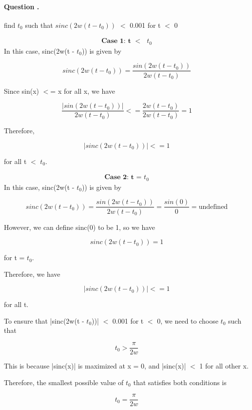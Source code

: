\documentclass[14pt,a4paper]{report}
\newcounter{question}
\newcommand*\question{%
\stepcounter{question}%
\paragraph{Question \thesection.\thequestion}}
\begin{document}
\question
{
    find $t_0$ such that $sinc(2w(t - t_0 ))$ $<$ 0.001 for t $<$ 0
}
\begin{answer_box*}

\begin{align}
    \textbf{Case 1: t $<$ $t_0$}
\end{align}
    In this case, sinc(2w(t - $t_0$)) is given by

    $$sinc(2w(t - t_0)) = \frac{sin(2w(t - t_0))}{2w(t - t_0)}$$

    Since sin(x) $<$= x for all x, we have

    $$\frac{|sin(2w(t - t_0))|}{2w(t - t_0)} <= \frac{2w(t - t_0)}{2w(t - t_0)} = 1$$

    Therefore,

    $$|sinc(2w(t - t_0))| <= 1$$

    for all t $<$ $t_0$.

\begin{align}
    \textbf{Case 2: t = $t_0$}
\end{align}
    In this case, sinc(2w(t - $t_0$)) is given by

    $$sinc(2w(t - t_0)) = \frac{sin(2w(t - t_0))}{2w(t - t_0)} = \frac{sin(0)}{0} = \text{undefined}$$

    However, we can define sinc(0) to be 1, so we have

    $$sinc(2w(t - t_0)) = 1$$

    for t = $t_0$.

    Therefore, we have

    $$|sinc(2w(t - t_0))| <= 1$$

    for all t.
    
    To ensure that |sinc(2w(t - $t_0$))| $<$ 0.001 for t $<$ 0, we need to choose $t_0$ such that

    $$t_0 > \frac{\pi}{2w}$$

    This is because |sinc(x)| is maximized at x = 0, and |sinc(x)| $<$ 1 for all other x.

    Therefore, the smallest possible value of $t_0$ that satisfies both conditions is

    $$t_0 = \frac{\pi}{2w}$$
\end{answer_box*}



\end{document}
